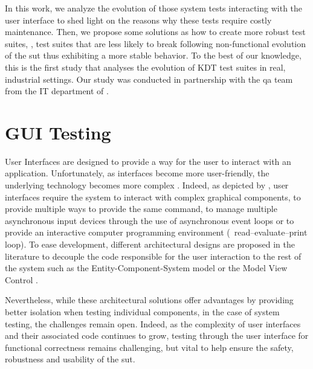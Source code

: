 In this work, we analyze the evolution of those system tests interacting with the user interface to shed light on the reasons why these tests require costly maintenance. Then, we propose some solutions as how to create more robust test suites, \ie, test suites that are less likely to break following non-functional evolution of the \gls{sut} thus exhibiting a more stable behavior. To the best of our knowledge, this is the first study that analyses the evolution of KDT test suites in real, industrial settings. Our study was conducted in partnership with the \gls{qa} team from the IT department of \BGL.

\section{GUI Testing}
\label{sec:introduction-gui-testing}

User Interfaces are designed to provide a way for the user to interact with an application. Unfortunately, as interfaces become more user-friendly, the underlying technology becomes more complex \cite{Myers1994}. Indeed, as depicted by \textcite{Myers1995}, user interfaces require the system to  interact with complex graphical components, to provide multiple ways to provide the same command, to manage multiple asynchronous input devices through the use of asynchronous event loops or to provide an interactive computer programming environment (\eg\ read–evaluate–print loop). To ease development, different architectural designs are proposed in the literature to decouple the code responsible for the user interaction to the rest of the system such as the Entity-Component-System model \cite{Raffaillac2018} or the Model View Control \cite{Krasner1988}.

Nevertheless, while these architectural solutions offer advantages by providing better isolation when testing individual components, in the case of system testing, the challenges remain open. Indeed, as the complexity of user interfaces and their associated code continues to grow, testing through the user interface for functional correctness remains challenging, but vital to help ensure the safety, robustness and usability of the \gls{sut}.

